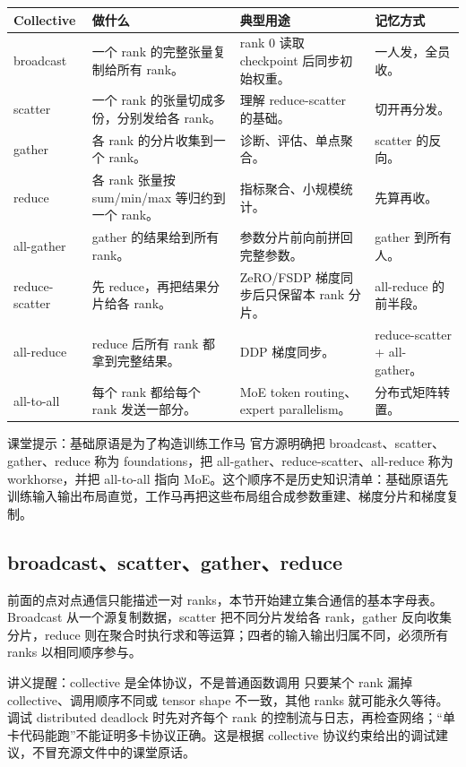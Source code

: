 \begin{longtable}{L{0.16\textwidth}L{0.26\textwidth}L{0.26\textwidth}L{0.16\textwidth}}
\toprule
Collective & 做什么 & 典型用途 & 记忆方式 \\
\midrule
\endhead
broadcast & 一个 rank 的完整张量复制给所有 rank。 & rank 0 读取 checkpoint 后同步初始权重。 & 一人发，全员收。 \\
scatter & 一个 rank 的张量切成多份，分别发给各 rank。 & 理解 reduce-scatter 的基础。 & 切开再分发。 \\
gather & 各 rank 的分片收集到一个 rank。 & 诊断、评估、单点聚合。 & scatter 的反向。 \\
reduce & 各 rank 张量按 sum/min/max 等归约到一个 rank。 & 指标聚合、小规模统计。 & 先算再收。 \\
all-gather & gather 的结果给到所有 rank。 & 参数分片前向前拼回完整参数。 & gather 到所有人。 \\
reduce-scatter & 先 reduce，再把结果分片给各 rank。 & ZeRO/FSDP 梯度同步后只保留本 rank 分片。 & all-reduce 的前半段。 \\
all-reduce & reduce 后所有 rank 都拿到完整结果。 & DDP 梯度同步。 & reduce-scatter + all-gather。 \\
all-to-all & 每个 rank 都给每个 rank 发送一部分。 & MoE token routing、expert parallelism。 & 分布式矩阵转置。 \\
\bottomrule
\end{longtable}

\begin{knowledgebox}{课堂提示：基础原语是为了构造训练工作马}
官方源明确把 broadcast、scatter、gather、reduce 称为 foundations，把 all-gather、reduce-scatter、all-reduce 称为 workhorse，并把 all-to-all 指向 MoE。这个顺序不是历史知识清单：基础原语先训练输入输出布局直觉，工作马再把这些布局组合成参数重建、梯度分片和梯度复制。
\end{knowledgebox}

\subsection{broadcast、scatter、gather、reduce}

前面的点对点通信只能描述一对 ranks，本节开始建立集合通信的基本字母表。Broadcast 从一个源复制数据，scatter 把不同分片发给各 rank，gather 反向收集分片，reduce 则在聚合时执行求和等运算；四者的输入输出归属不同，必须所有 ranks 以相同顺序参与。

\begin{knowledgebox}{讲义提醒：collective 是全体协议，不是普通函数调用}
只要某个 rank 漏掉 collective、调用顺序不同或 tensor shape 不一致，其他 ranks 就可能永久等待。调试 distributed deadlock 时先对齐每个 rank 的控制流与日志，再检查网络；“单卡代码能跑”不能证明多卡协议正确。这是根据 collective 协议约束给出的调试建议，不冒充源文件中的课堂原话。
\end{knowledgebox}

